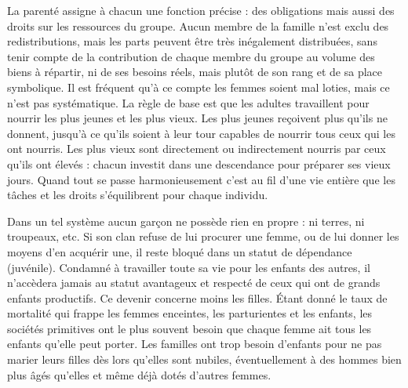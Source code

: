 La parenté assigne à chacun une fonction précise : des obligations mais aussi des droits sur les ressources du groupe. Aucun membre de la famille n'est exclu des redistributions, mais les parts peuvent être très inégalement distribuées, sans tenir compte de la contribution de chaque membre du groupe au volume des biens à répartir, ni de ses besoins réels, mais plutôt de son rang et de sa place symbolique. Il est fréquent qu’à ce compte les femmes soient mal loties, mais ce n’est pas systématique. La règle de base est que les adultes travaillent pour nourrir les plus jeunes et les plus vieux. Les plus jeunes reçoivent plus qu'ils ne donnent, jusqu'à ce qu'ils soient à leur tour capables de nourrir tous ceux qui les ont nourris. Les plus vieux sont directement ou indirectement nourris par ceux qu'ils ont élevés : chacun investit dans une descendance pour préparer ses vieux jours. Quand tout se passe harmonieusement c'est au fil d'une vie entière que les tâches et les droits s'équilibrent pour chaque individu.

Dans un tel système aucun garçon ne possède rien en propre : ni terres, ni troupeaux, etc. Si son clan refuse de lui procurer une femme, ou de lui donner les moyens d'en acquérir une, il reste bloqué dans un statut de dépendance (juvénile). Condamné à travailler toute sa vie pour les enfants des autres, il n'accèdera jamais au statut avantageux et respecté de ceux qui ont de grands enfants productifs.
Ce devenir concerne moins les filles. Étant donné le taux de mortalité qui frappe les femmes enceintes, les parturientes et les enfants, les sociétés primitives ont le plus souvent besoin que chaque femme ait tous les enfants qu'elle peut porter. Les familles ont trop besoin d'enfants pour ne pas marier leurs filles dès lors qu'elles sont nubiles, éventuellement à des hommes bien plus âgés qu'elles et même déjà dotés d'autres femmes.

